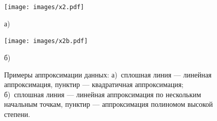 \begin{figure}[h]
\begin{minipage}[t]{0.49\columnwidth}%
\begin{center}
\texttt{[image: images/x2.pdf]}
\par\end{center}
\begin{center}
а)
\par\end{center}%
\end{minipage}%
\begin{minipage}[t]{0.49\columnwidth}%
\begin{center}
\texttt{[image: images/x2b.pdf]}
\par\end{center}
\begin{center}
б)
\par\end{center}%
\end{minipage}
\caption{\label{fig:approx}Примеры аппроксимации данных: а)~сплошная линия
--- линейная аппроксимация, пунктир --- квадратичная
аппроксимация; б)~сплошная линия --- линейная аппроксимация
по нескольким начальным точкам, пунктир --- аппроксимация
полиномом высокой степени.}
\end{figure}

\enlargethispage{1em}

